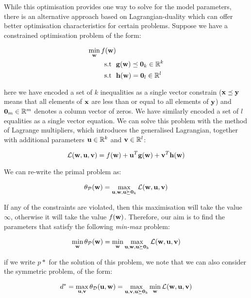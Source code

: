 While this optimisation provides one way to solve for the model parameters, there is an alternative approach based on Lagrangian-duality which can offer better optimisation characteristics for certain problems.  Suppose we have a constrained optimisation problem of the form:

\begin{align}
\min_{\mathbf{w}} f(\mathbf{w}) & \\
\mbox{\text{s.t }  } &  \mathbf{g}(\mathbf{w}) \preceq \mathbf{0}_k \in \mathbb{R}^k \\
\mbox{\text{s.t }  } & \mathbf{h}(\mathbf{w}) = \mathbf{0}_l \in \mathbb{R}^l
\end{align}

here we have encoded a set of $k$ inequalities as a single vector constrain ($\mathbf{x} \preceq \mathbf{y}$ means that all elements of $\mathbf{x}$ are less than or equal to all elements of $\mathbf{y}$) and $\mathbf{0}_m \in \mathbb{R}^m$ denotes a column vector of zeros.  We have similarly encoded a set of $l$ equalities as  a single vector equation.  We can solve this problem with the method of Lagrange multipliers, which introduces the generalised Lagrangian, together with additional parameters $\mathbf{u} \in \mathbb{R}^k$ and $\mathbf{v} \in \mathbb{R}^l$:

\begin{align}
\mathcal{L}(\mathbf{w}, \mathbf{u}, \mathbf{v}) = f(\mathbf{w}) + \mathbf{u}^T \mathbf{g}(\mathbf{w}) + \mathbf{v}^T \mathbf{h}(\mathbf{w})
\end{align}

We can re-write the primal problem as:

\begin{align}
\theta_{\mathcal{P}}(\mathbf{w}) = \max_{\mathbf{u}, \mathbf{w}, \mathbf{u} \succeq \mathbf{0}_k} \mathcal{L}(\mathbf{w}, \mathbf{u}, \mathbf{v})
\end{align}

If any of the constraints are violated, then this maximisation will take the value $\infty$, otherwise it will take the value $f(\mathbf{w})$.  Therefore, our aim is to find the parameters that satisfy the following \textit{min-max} problem:

\begin{align}
\min_{\mathbf{w}} \theta_{\mathcal{P}}(\mathbf{w}) = \min_{\mathbf{w}} \max_{\mathbf{u}, \mathbf{w}, \mathbf{u} \succeq \mathbf{0}_k} \mathcal{L}(\mathbf{w}, \mathbf{u}, \mathbf{v})
\end{align}
 
if we write $p*$ for the solution of this problem, we note that we can also consider the symmetric  problem, of the form:

\begin{align}
d^* = \max_{\mathbf{u}, \mathbf{v}} \theta_{\mathcal{D}}(\mathbf{u}, \mathbf{w}) = \max_{\mathbf{u}, \mathbf{v}, \mathbf{u} \succeq \mathbf{0}_k} \min_{\mathbf{w}} \mathcal{L}(\mathbf{w}, \mathbf{u}, \mathbf{v})
\end{align}

